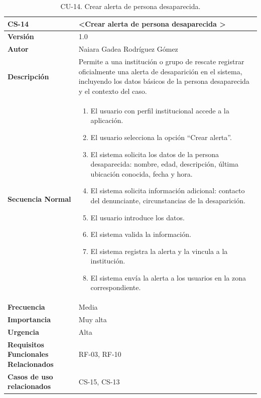 \begin{table}[htbp] %
\centering
\begin{tabular}{ |m{3cm}|m{11cm}|  } 
\hline
\cellcolor[HTML]{B9E3F0}\centering\textbf{CS-14} & \cellcolor[HTML]{B9E3F0}\textbf{\textless Crear alerta de persona desaparecida \textgreater}\\

\hline
\cellcolor[HTML]{EFEFEF}\textbf{Versión}             & 1.0  \\
\hline
\cellcolor[HTML]{EFEFEF}\textbf{Autor}                & Naiara Gadea Rodríguez Gómez\\
\hline
\cellcolor[HTML]{EFEFEF}\textbf{Descripción}                & {Permite a una institución o grupo de rescate registrar oficialmente una alerta de desaparición en el sistema, incluyendo los datos básicos de la persona desaparecida y el contexto del caso.}\\
\hline
\cellcolor[HTML]{EFEFEF}\textbf{Secuencia \newline Normal}                &                 
        \begin{enumerate}
			\item El usuario con perfil institucional accede a la aplicación.
			\item El usuario selecciona la opción “Crear alerta”.
			\item El sistema solicita los datos de la persona desaparecida: nombre, edad, descripción, última ubicación conocida, fecha y hora.
			\item El sistema solicita información adicional: contacto del denunciante, circunstancias de la desaparición.
			\item El usuario introduce los datos.
			\item El sistema valida la información.
			\item El sistema registra la alerta y la vincula a la institución.
			\item El sistema envía la alerta a los usuarios en la zona correspondiente.
		\end{enumerate}\\
\hline
\cellcolor[HTML]{EFEFEF}\textbf{Frecuencia}                & Media\\
\hline
\cellcolor[HTML]{EFEFEF}\textbf{Importancia}                & Muy alta\\
\hline
\cellcolor[HTML]{EFEFEF}\textbf{Urgencia}                & Alta\\
\hline
\cellcolor[HTML]{EFEFEF}\textbf{Requisitos Funcionales Relacionados}                & {RF-03, RF-10}\\
\hline
\cellcolor[HTML]{EFEFEF}\textbf{Casos de uso relacionados}                & {CS-15, CS-13}\\
\hline
\end{tabular}
\caption{CU-14. Crear alerta de persona desaparecida.}
\end{table}

